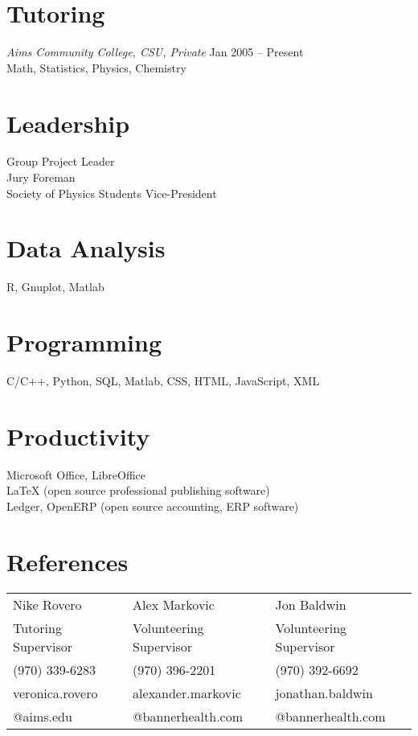 \documentclass[margin]{res}
\begin{document}
\begin{resume}
\section{Tutoring}
{\sl Aims Community College, CSU, Private} \hfill Jan 2005 -- Present\\
Math, Statistics, Physics, Chemistry

\section{Leadership}
Group Project Leader\\
Jury Foreman\\
Society of Physics Students Vice-President

\section{Data Analysis}
R, Gnuplot, Matlab

\section{Programming}
C/C++, Python, SQL, Matlab, CSS, HTML, JavaScript, XML

\section{Productivity}
Microsoft Office, LibreOffice\\
LaTeX (open source professional publishing software)\\
Ledger, OpenERP (open source accounting, ERP software)

\section{References}
\hskip-0.08in
\begin{tabular}{lll}
Nike Rovero         & Alex Markovic            & Jon Baldwin             \\
Tutoring Supervisor & Volunteering Supervisor  & Volunteering Supervisor \\
(970) 339-6283      & (970) 396-2201           & (970) 392-6692          \\
veronica.rovero     & alexander.markovic       & jonathan.baldwin        \\
@aims.edu           & @bannerhealth.com        & @bannerhealth.com       
\end{tabular}

\end{resume}
\end{document}
